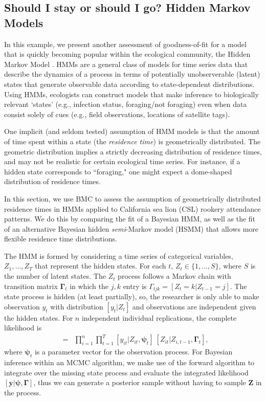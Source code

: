 \documentclass[12pt,english]{article}
\begin{document}
\begin{spacing}{1.9}
\subsection{Should I stay or should I go? Hidden Markov Models}

In this example, we present another assessment of goodness-of-fit for a model that is quickly becoming popular within the ecological community, the Hidden Markov Model \citep[HMM;][]{zucchini2009hidden}. HMMs are a general class of models for time series data that describe the dynamics of a process in terms of potentially unobserverable (latent) states that generate observable data according to state-dependent distributions. Using HMMs, ecologists can construct models that make inference to biologically relevant `states' (e.g., infection status, foraging/not foraging) even when data consist solely of cues (e.g., field observations, locations of satellite tags).

One implicit (and seldom tested) assumption of HMM models is that the amount of time spent within a state (the {\it residence time}) is geometrically distributed. The geometric distribution implies a strictly decreasing distribution of residence times, and may not be realistic for certain ecological time series.  For instance, if a hidden state corresponds to ``foraging," one might expect a dome-shaped distribution of residence times.

In this section, we use BMC to assess the assumption of geometrically distributed residence times in HMMs applied to California sea lion (CSL) rookery attendance patterns.  We do this by comparing the fit of a Bayesian HMM, as well as the fit of an alternative Bayesian hidden \textit{semi}-Markov model (HSMM) that allows more flexible residence time distributions.


The HMM is formed by considering a time series of categorical variables, $Z_{1}, \dots, Z_{T}$ that represent the hidden states. For each $t$, $Z_{t} \in \{1, \dots, S\}$, where $S$ is the number of latent states. The $Z_t$ process follows a Markov chain with transition matrix $\boldsymbol{\Gamma}_t$ in which the $j,k$ entry is $\Gamma_{tjk} = [Z_t = k | Z_{t-1} = j]$. The state process is hidden (at least partially), so, the researcher is only able to make observation $y_t$ with distribution $[y_t|Z_t]$ and observations are independent given the hidden states. For $n$ independent individual replications, the complete likelihood is
\begin{eqnarray*}
[\mathbf{y}, \mathbf{Z}| \boldsymbol{\psi}, \boldsymbol{\Gamma}] & = & \prod_{i=1}^n\prod_{t=1}^T [y_{it}|Z_{it}, \boldsymbol{\psi}_t]\ [Z_{it}|Z_{i,t-1},\boldsymbol{\Gamma}_t],
\end{eqnarray*}
 where $\boldsymbol{\psi}_t$ is a parameter vector for the observation process. For Bayesian inference within an MCMC algorithm, we make use of the forward algorithm \citep[see][]{zucchini2009hidden} to integrate over the missing state process and evaluate the integrated likelihood $[\mathbf{y}|\boldsymbol{\psi}, \boldsymbol{\Gamma}]$, thus we can generate a posterior sample without having to sample $\boldsymbol{Z}$ in the process.


\end{spacing}
\end{document}
